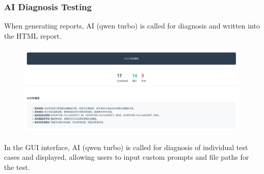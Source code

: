\documentclass{article}
\begin{document}
\subsubsection{AI Diagnosis Testing}
When generating reports, AI (qwen turbo) is called for diagnosis and written into the HTML report.
\begin{figure}[H]
    \centering
    \includegraphics[width=\textwidth]{img/ai.png}
\end{figure}
In the GUI interface, AI (qwen turbo) is called for diagnosis of individual test cases and displayed, allowing users to input custom prompts and file paths for the test.
\end{document}
